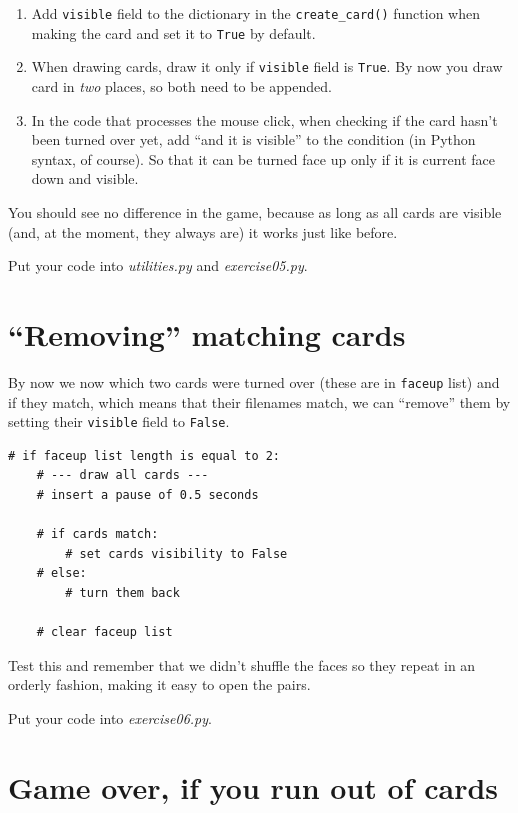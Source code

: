 \documentclass[
]{book}
\providecommand{\tightlist}{%
  \setlength{\itemsep}{0pt}\setlength{\parskip}{0pt}}
\begin{document}
\begin{enumerate}
\def\labelenumi{\arabic{enumi}.}
\tightlist
\item
  Add \texttt{visible} field to the dictionary in the \texttt{create\_card()} function when making the card and set it to \texttt{True} by default.
\item
  When drawing cards, draw it only if \texttt{visible} field is \texttt{True}. By now you draw card in \emph{two} places, so both need to be appended.
\item
  In the code that processes the mouse click, when checking if the card hasn't been turned over yet, add ``and it is visible'' to the condition (in Python syntax, of course). So that it can be turned face up only if it is current face down and visible.
\end{enumerate}

You should see no difference in the game, because as long as all cards are visible (and, at the moment, they always are) it works just like before.

Put your code into \emph{utilities.py} and \emph{exercise05.py}.

\hypertarget{removing-matching-cards}{%
\section{``Removing'' matching cards}\label{removing-matching-cards}}

By now we now which two cards were turned over (these are in \texttt{faceup} list) and if they match, which means that their filenames match, we can ``remove'' them by setting their \texttt{visible} field to \texttt{False}.

\begin{verbatim}
# if faceup list length is equal to 2:
    # --- draw all cards ---
    # insert a pause of 0.5 seconds

    # if cards match:
        # set cards visibility to False
    # else:
        # turn them back

    # clear faceup list
\end{verbatim}

Test this and remember that we didn't shuffle the faces so they repeat in an orderly fashion, making it easy to open the pairs.

Put your code into \emph{exercise06.py}.

\hypertarget{game-over-if-you-run-out-of-cards}{%
\section{Game over, if you run out of cards}\label{game-over-if-you-run-out-of-cards}}
\end{document}
